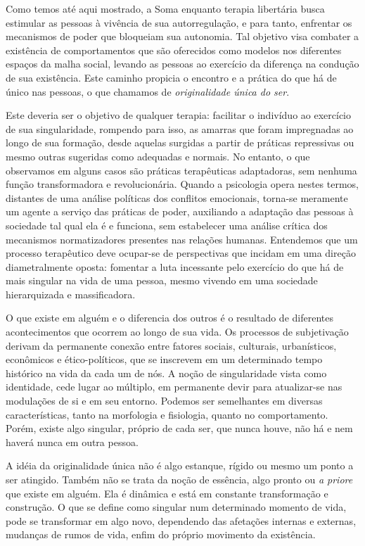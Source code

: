 Como temos até aqui mostrado, a Soma enquanto terapia libertária busca
estimular as pessoas à vivência de sua autorregulação, e para tanto,
enfrentar os mecanismos de poder que bloqueiam sua autonomia. Tal
objetivo visa combater a existência de comportamentos que são oferecidos
como modelos nos diferentes espaços da malha social, levando as pessoas
ao exercício da diferença na condução de sua existência. Este caminho
propicia o encontro e a prática do que há de único nas pessoas, o que
chamamos de \emph{originalidade única do ser}.

Este deveria ser o objetivo de qualquer terapia: facilitar o indivíduo
ao exercício de sua singularidade, rompendo para isso, as amarras que
foram impregnadas ao longo de sua formação, desde aquelas surgidas a
partir de práticas repressivas ou mesmo outras sugeridas como adequadas
e normais. No entanto, o que observamos em alguns casos são práticas
terapêuticas adaptadoras, sem nenhuma função transformadora e
revolucionária. Quando a psicologia opera nestes termos, distantes de
uma análise políticas dos conflitos emocionais, torna-se meramente um
agente a serviço das práticas de poder, auxiliando a adaptação das
pessoas à sociedade tal qual ela é e funciona, sem estabelecer uma
análise crítica dos mecanismos normatizadores presentes nas relações
humanas. Entendemos que um processo terapêutico deve ocupar-se de
perspectivas que incidam em uma direção diametralmente oposta: fomentar
a luta incessante pelo exercício do que há de mais singular na vida de
uma pessoa, mesmo vivendo em uma sociedade hierarquizada e
massificadora.

O que existe em alguém e o diferencia dos outros é o resultado de
diferentes acontecimentos que ocorrem ao longo de sua vida. Os processos
de subjetivação derivam da permanente conexão entre fatores sociais,
culturais, urbanísticos, econômicos e ético-políticos, que se inscrevem
em um determinado tempo histórico na vida da cada um de nós. A noção de
singularidade vista como identidade, cede lugar ao múltiplo, em
permanente devir para atualizar-se nas modulações de si e em seu
entorno. Podemos ser semelhantes em diversas características, tanto na
morfologia e fisiologia, quanto no comportamento. Porém, existe algo
singular, próprio de cada ser, que nunca houve, não há e nem haverá
nunca em outra pessoa.

A idéia da originalidade única não é algo estanque, rígido ou mesmo um
ponto a ser atingido. Também não se trata da noção de essência, algo
pronto ou \emph{a priore} que existe em alguém. Ela é dinâmica e está em
constante transformação e construção. O que se define como singular num
determinado momento de vida, pode se transformar em algo novo,
dependendo das afetações internas e externas, mudanças de rumos de vida,
enfim do próprio movimento da existência.

